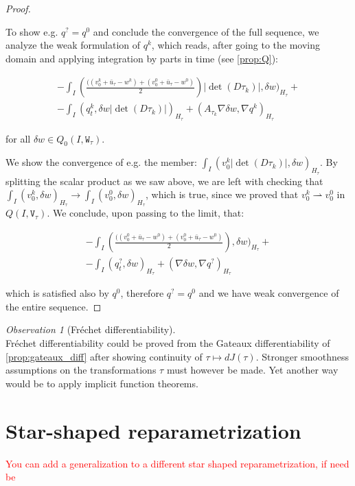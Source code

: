 \documentclass[english,a4paper,9pt,oneside]{scrbook}	%
\theoremstyle{break}
\newenvironment{mproof}[1][\proofname]{%
  \begin{proof}[#1]$ $\par\nobreak\ignorespaces
}{%
  \end{proof}
}
\renewcommand*{\proofname}{Proof}
\theoremstyle{remark}
\newtheorem{obs}[equation]{Observation}
\newcommand{\weakc}{\rightharpoonup}
\newcommand{\tw}[1]{\texttt{#1}}
\begin{document}
\begin{mproof}
To show e.g. $q^?=q^0$ and conclude the convergence of the full sequence, we analyze the weak formulation of $q^k$, which reads, after going to the moving domain and applying integration by parts in time (see \cref{prop:Q}):

\begin{align*}
-\int_I \left (\frac{((v_0^k+\bar{u}_\tau - w^k)+(v_0^0+\bar{u}_\tau - w^0)}{2}\right )|\det(D\tau_k)|,\delta w)_{H_\tau}+\\
-\int_I (  q^k_t ,   \delta w |\det(D\tau_k)|)_{H_\tau}+ (A_{\tau_k}\nabla \delta w, \nabla q^k)_{H_\tau}
\end{align*}

for all $\delta w \in Q_0(I,\tw{W}_{ \tau})$.

We show the convergence of e.g. the member: $\int_I( v_0^k|\det(D\tau_k)|,\delta w)_{H_\tau}$. By splitting the scalar product as we saw above, we are left with checking that $\int_I (v_0^k,\delta w)_{H_\tau}\rightarrow  \int_I (v_0^0,\delta w)_{H_\tau}$, which is true, since we proved that $v_0^k \weakc v_0^0$ in $Q(I,\tw{V}_\tau)$. We conclude, upon passing to the limit, that:

\begin{align*}
-\int_I \left (\frac{((v_0^0+\bar{u}_\tau - w^0)+(v_0^0+\bar{u}_\tau - w^0)}{2}\right ),\delta w)_{H_\tau}+\\
-\int_I (  q^?_t ,   \delta w )_{H_\tau}+ (\nabla \delta w, \nabla q^?)_{H_\tau}
\end{align*}

which is satisfied also by $q^0$, therefore $q^? = q^0$ and we have weak convergence of the entire sequence.

\end{mproof}

\begin{obs}[Fréchet differentiability]
\mbox{}\\
Fréchet differentiability could be proved from the Gateaux differentiability of \cref{prop:gateaux_diff} after showing continuity of $\tau\mapsto dJ(\tau)$. Stronger smoothness assumptions on the transformations $\tau$ must however be made. 
Yet another way would be to apply implicit function theorems.
\end{obs}

\section{Star-shaped reparametrization}
\label{sec:star}
\textcolor{red}{You can add a generalization to a different star shaped reparametrization, if need be}
\end{document}
